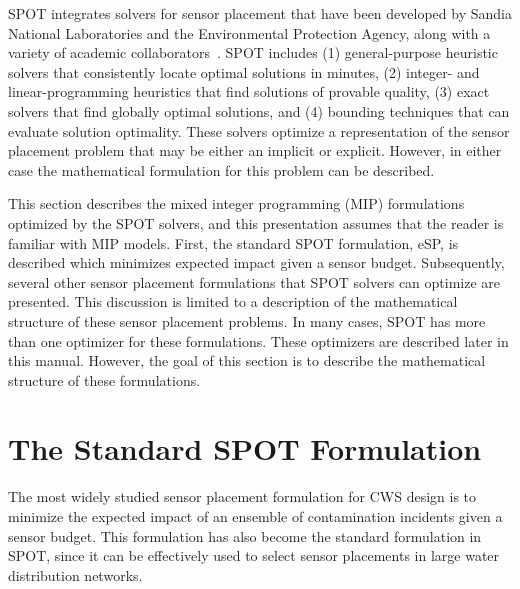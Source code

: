
SPOT integrates solvers for sensor placement that have been developed by Sandia National Laboratories and the Environmental Protection Agency, along with a variety of academic collaborators~\cite{MurUbeJan06,MurBerHar06,CarGreHarKonLauLinMorPhi06,HarBerMurPhiRieWat07,BerHarPhiUbeWat06,BerFleHarPhiWat05}.
SPOT includes (1) general-\/purpose heuristic solvers that
consistently locate optimal solutions in minutes, (2) integer-\/ and
linear-\/programming heuristics that find solutions of provable quality,
(3) exact solvers that find globally optimal solutions, and (4) bounding
techniques that can evaluate solution optimality. These solvers optimize
a representation of the sensor placement problem that may be either
an implicit or explicit. However, in either case the mathematical formulation for this problem can be described.

This section describes the mixed integer programming (MIP) formulations optimized by the SPOT solvers, and this presentation assumes that the reader is familiar with MIP models. First, the standard SPOT formulation, eSP, is described which minimizes expected impact given a sensor budget. Subsequently, several other sensor placement formulations that SPOT solvers can optimize are presented. This discussion is limited to a description of the mathematical structure of these sensor placement problems. In many cases, SPOT has more than one optimizer for these formulations. These optimizers are described later in this manual. However, the goal of this section is to describe the mathematical structure of these formulations.

\section{The Standard SPOT Formulation}\label{formulations_formulationsCanonical}

The most widely studied sensor placement formulation for CWS design is to minimize the expected impact of an ensemble of contamination incidents given a sensor budget. This formulation has also become the standard formulation in SPOT, since it can be effectively used to select sensor placements in large water distribution networks.

